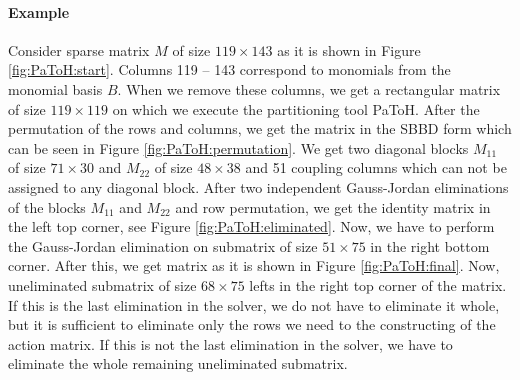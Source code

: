 \paragraph{Example}
Consider sparse matrix $M$ of size $119\times 143$ as it is shown in Figure \ref{fig:PaToH:start}. Columns 119 -- 143 correspond to monomials from the monomial basis $B$. When we remove these columns, we get a rectangular matrix of size $119 \times 119$ on which we execute the partitioning tool PaToH. After the permutation of the rows and columns, we get the matrix in the SBBD form which can be seen in Figure \ref{fig:PaToH:permutation}. We get two diagonal blocks $M_{11}$ of size $71\times 30$ and $M_{22}$ of size $48 \times 38$ and 51 coupling columns which can not be assigned to any diagonal block. After two independent Gauss-Jordan eliminations of the blocks $M_{11}$ and $M_{22}$ and row permutation, we get the identity matrix in the left top corner, see Figure \ref{fig:PaToH:eliminated}. Now, we have to perform the Gauss-Jordan elimination on submatrix of size $51 \times 75$ in the right bottom corner. After this, we get matrix as it is shown in Figure \ref{fig:PaToH:final}. Now, uneliminated submatrix of size $68 \times 75$ lefts in the right top corner of the matrix. If this is the last elimination in the solver, we do not have to eliminate it whole, but it is sufficient to eliminate only the rows we need to the constructing of the action matrix. If this is not the last elimination in the solver, we have to eliminate the whole remaining uneliminated submatrix.

